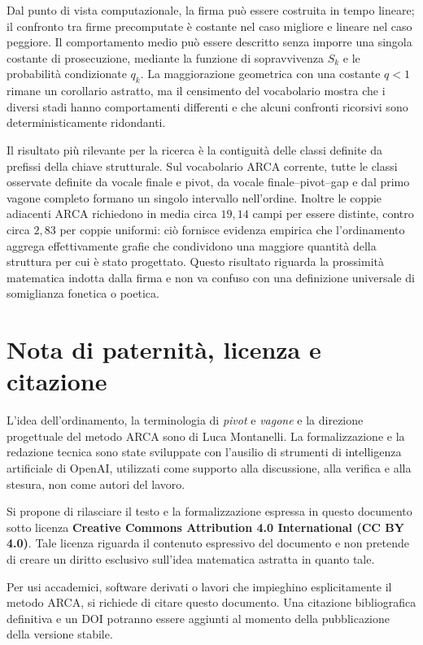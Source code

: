 \documentclass[11pt,a4paper]{article}
\theoremstyle{definition}
\theoremstyle{remark}
\begin{document}
Dal punto di vista computazionale, la firma può essere costruita in tempo lineare; il confronto tra firme precomputate è costante nel caso migliore e lineare nel caso peggiore. Il comportamento medio può essere descritto senza imporre una singola costante di prosecuzione, mediante la funzione di sopravvivenza $S_k$ e le probabilità condizionate $q_k$. La maggiorazione geometrica con una costante $q<1$ rimane un corollario astratto, ma il censimento del vocabolario mostra che i diversi stadi hanno comportamenti differenti e che alcuni confronti ricorsivi sono deterministicamente ridondanti.

Il risultato più rilevante per la ricerca è la contiguità delle classi definite da prefissi della chiave strutturale. Sul vocabolario ARCA corrente, tutte le classi osservate definite da vocale finale e pivot, da vocale finale--pivot--gap e dal primo vagone completo formano un singolo intervallo nell'ordine. Inoltre le coppie adiacenti ARCA richiedono in media circa $19{,}14$ campi per essere distinte, contro circa $2{,}83$ per coppie uniformi: ciò fornisce evidenza empirica che l'ordinamento aggrega effettivamente grafie che condividono una maggiore quantità della struttura per cui è stato progettato. Questo risultato riguarda la prossimità matematica indotta dalla firma e non va confuso con una definizione universale di somiglianza fonetica o poetica.


\section*{Nota di paternità, licenza e citazione}

L'idea dell'ordinamento, la terminologia di \emph{pivot} e \emph{vagone} e la direzione progettuale del metodo ARCA sono di Luca Montanelli. La formalizzazione e la redazione tecnica sono state sviluppate con l'ausilio di strumenti di intelligenza artificiale di OpenAI, utilizzati come supporto alla discussione, alla verifica e alla stesura, non come autori del lavoro.

Si propone di rilasciare il testo e la formalizzazione espressa in questo documento sotto licenza \textbf{Creative Commons Attribution 4.0 International (CC BY 4.0)}. Tale licenza riguarda il contenuto espressivo del documento e non pretende di creare un diritto esclusivo sull'idea matematica astratta in quanto tale.

Per usi accademici, software derivati o lavori che impieghino esplicitamente il metodo ARCA, si richiede di citare questo documento. Una citazione bibliografica definitiva e un DOI potranno essere aggiunti al momento della pubblicazione della versione stabile.
\end{document}
